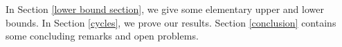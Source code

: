 \documentclass[12pt]{article}%
\newtheorem{theorem}{Theorem}[section]
\begin{document}

    In Section \ref{lower bound section}, we give some elementary upper and lower bounds.  In Section \ref{cycles}, we prove our results.    
    Section \ref{conclusion} contains some concluding remarks and open problems.  

   

    
	
\end{document}
